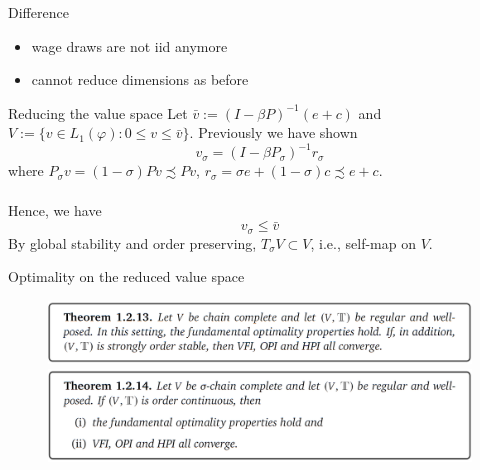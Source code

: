 \begin{frame}{Difference}
\begin{itemize}
    \item wage draws are not iid anymore
    \item cannot reduce dimensions as before
\end{itemize}
    
\end{frame}
\begin{frame}{Reducing the value space}
    Let $\bar v:= (I-\beta P)^{-1}(e+c)$ and $V:= \{v\in L_1(\varphi): 0\le v\le \bar v\}$. Previously we have shown
    $$
    v_\sigma  = (I-\beta P_\sigma)^{-1}r_\sigma
    $$
    where $P_\sigma v =   (1-\sigma)P v \precsim Pv $, $r_\sigma  = \sigma e +(1-\sigma)c\precsim e+c$.\\
    \\
    
    Hence, we have
    $$
    v_\sigma \le \bar v
    $$
    By global stability and order preserving, $T_\sigma V\subset V$, i.e., self-map on $V$.
\end{frame}

\begin{frame}{Optimality on the reduced value space}
    \begin{figure}
        \centering
        \includegraphics[width=1\linewidth]{Dynamic Programming/DP2/Chapter 4/Section 4.1.1. Job Search/thm 1.2.13.png}
        \includegraphics[width=1\linewidth]{Dynamic Programming/DP2/Chapter 4/Section 4.1.1. Job Search/thm1.2.14.png}
    \end{figure}
\end{frame}